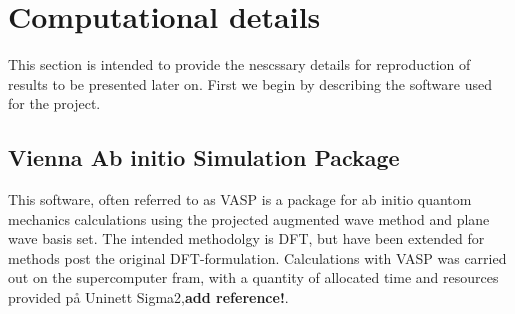 \chapter{Computational details}
\label{sec:Computation}

This section is intended to provide the nescssary details for reproduction of results to be presented later on. First we begin by describing the software used for the project. 

\section{Vienna Ab initio Simulation Package}
This software, often referred to as VASP is a package for ab initio quantom mechanics calculations using the projected augmented wave method and plane wave basis set. The intended methodolgy is DFT, but have been extended for methods post the original DFT-formulation. Calculations with VASP was carried out on the supercomputer fram, with a quantity of allocated time and resources provided på Uninett Sigma2,\textbf{add reference!}.

